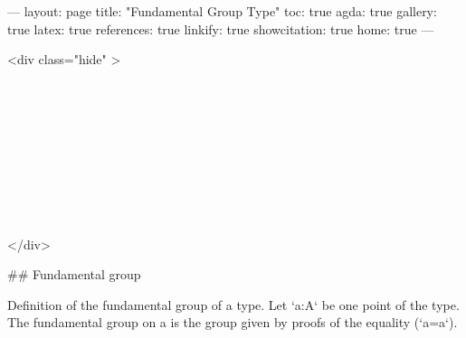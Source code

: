 ---
layout: page
title: "Fundamental Group Type"
toc: true
agda: true
gallery: true
latex: true
references: true
linkify: true
showcitation: true
home: true
---


<div class="hide" >
\begin{code}%
\>[0]\AgdaSymbol{\{-\#}\AgdaSpace{}%
\AgdaSpace{}%
\AgdaSpace{}%
\AgdaSymbol{\#-\}}\<%
\\
\>[0]\AgdaSpace{}%
\AgdaSpace{}%
\<%
\\
\>[0]\AgdaSpace{}%
\AgdaSpace{}%
\<%
\\
%
\\[\AgdaEmptyExtraSkip]%
\>[0]\AgdaSpace{}%
\AgdaSpace{}%
\<%
\\
\>[0]\AgdaSpace{}%
\AgdaSpace{}%
\<%
\\
\>[0]\AgdaSpace{}%
\AgdaSpace{}%
\<%
\\
\>[0]\AgdaSpace{}%
\AgdaSpace{}%
\<%
\\
\>[0]\AgdaSpace{}%
\AgdaSpace{}%
\<%
\end{code}
</div>

## Fundamental group

Definition of the fundamental group of a type.
Let `a:A` be one point of the type. The fundamental group on a is the
group given by proofs of the equality (`a=a`).

